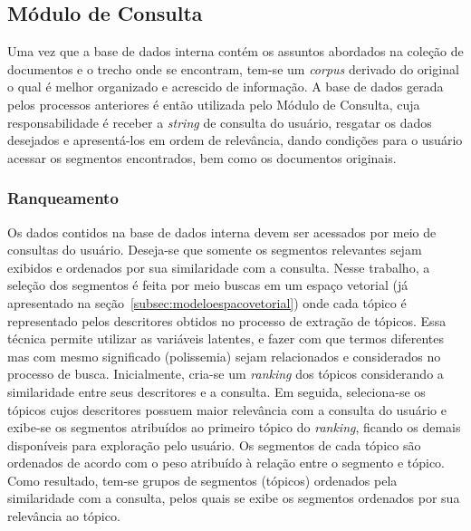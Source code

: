 
\subsection{Módulo de Consulta}


Uma vez que a base de dados interna contém os assuntos abordados na coleção de documentos e o trecho onde se encontram, tem-se um \textit{corpus} derivado do original o qual é melhor organizado e acrescido de informação. A base de dados gerada pelos processos anteriores é então utilizada pelo Módulo de Consulta, cuja responsabilidade é receber a \textit{string} de consulta do usuário, resgatar os dados desejados e apresentá-los em ordem de relevância, dando condições para o usuário acessar os segmentos encontrados, bem como os documentos originais.

\subsubsection{Ranqueamento}
\label{sec-ranqueamento}

Os dados contidos na base de dados interna devem ser acessados por meio de consultas do usuário. Deseja-se que somente os segmentos relevantes sejam exibidos e ordenados por sua similaridade com a consulta. 
Nesse trabalho, a seleção dos segmentos é feita por meio buscas em um espaço vetorial (já apresentado na seção~\ref{subsec:modeloespacovetorial}) onde cada tópico é representado pelos descritores obtidos no processo de extração de tópicos. Essa técnica permite utilizar as variáveis latentes, e fazer com que termos diferentes mas com mesmo significado (polissemia) sejam relacionados e considerados no processo de busca.
Inicialmente, cria-se um \textit{ranking} dos tópicos considerando a similaridade entre seus descritores e a consulta. Em seguida, seleciona-se os tópicos cujos descritores possuem maior relevância com a consulta do usuário e exibe-se os segmentos atribuídos ao primeiro tópico do \textit{ranking}, ficando os demais disponíveis para exploração pelo usuário. 
Os segmentos de cada tópico são ordenados de acordo com o peso atribuído à relação entre o segmento e tópico.  Como resultado, tem-se grupos de segmentos (tópicos) ordenados pela similaridade com a consulta, pelos quais se exibe os segmentos ordenados por sua relevância ao tópico. 






